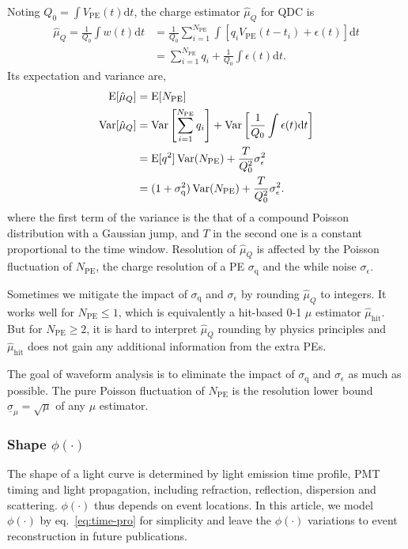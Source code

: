 Noting $Q_0 = {\int V_\mathrm{PE}(t) \mathrm{d} t}$, the charge estimator $\hat{\mu}_Q$ for QDC is
\begin{equation}
  \begin{aligned}
  \label{eq:mu-q}
  \hat{\mu}_Q = \frac{1}{Q_0}\int w(t) \mathrm{d} t &= \frac{1}{Q_0}\sum_{i=1}^{N_\mathrm{PE}} \int \left[ q_i V_\mathrm{PE}(t-t_i) + \epsilon(t) \right] \mathrm{d} t \\
  & = \sum_{i=1}^{N_\mathrm{PE}} q_i + \frac{1}{Q_0} \int \epsilon(t) \mathrm{d} t.
  \end{aligned}
\end{equation}
Its expectation and variance are,
\begin{equation}
  \label{eq:energy}
  \begin{aligned}
    \operatorname{E}[\hat{\mu}_Q] &= \operatorname{E}[N_\mathrm{PE}] \\
    \operatorname{Var}[\hat{\mu}_Q] &= \operatorname{Var}\left[\sum_{i=1}^{N_\mathrm{PE}} q_i\right] + \operatorname{Var}\left[\frac{1}{Q_0} \int \epsilon(t) \mathrm{d} t\right] \\
    &= \operatorname{E}[q^2] \operatorname{Var}(N_\mathrm{PE}) + \frac{T}{Q_0^2} \sigma_\epsilon^2 \\
    &= (1 + \sigma_\mathrm{q}^2) \operatorname{Var}(N_\mathrm{PE}) + \frac{T}{Q_0^2} \sigma_\epsilon^2. \\
  \end{aligned}
\end{equation}
where the first term of the variance is the that of a compound Poisson distribution with a Gaussian jump, and $T$ in the second one is a constant proportional to the time window.  Resolution of $\hat{\mu}_Q$ is affected by the Poisson fluctuation of $N_\mathrm{PE}$, the charge resolution of a PE $\sigma_\mathrm{q}$ and the while noise $\sigma_\epsilon$.

Sometimes we mitigate the impact of $\sigma_\mathrm{q}$ and $\sigma_\epsilon$ by rounding $\hat{\mu}_Q$ to integers.  It works well for $N_\mathrm{PE} \le 1$, which is equivalently a hit-based 0-1 $\mu$ estimator $\hat{\mu}_\mathrm{hit}$.  But for $N_\mathrm{PE} \ge 2$, it is hard to interpret $\hat{\mu}_Q$ rounding by physics principles and $\hat{\mu}_\mathrm{hit}$ does not gain any additional information from the extra PEs.

The goal of waveform analysis is to eliminate the impact of $\sigma_\mathrm{q}$ and $\sigma_\epsilon$ as much as possible.  The pure Poisson fluctuation of $N_\mathrm{PE}$ is the resolution lower bound $\underline{\sigma}_\mu = \sqrt{\mu}$ of any $\mu$ estimator.

\subsubsection{Shape $\phi(\cdot)$}
\label{sec:shape-phicdot}

The shape of a light curve is determined by light emission time profile, PMT timing and light propagation, including refraction, reflection, dispersion and scattering.  $\phi(\cdot)$ thus depends on event locations.  In this article, we model $\phi(\cdot)$ by eq.~\eqref{eq:time-pro} for simplicity and leave the $\phi(\cdot)$ variations to event reconstruction in future publications.
